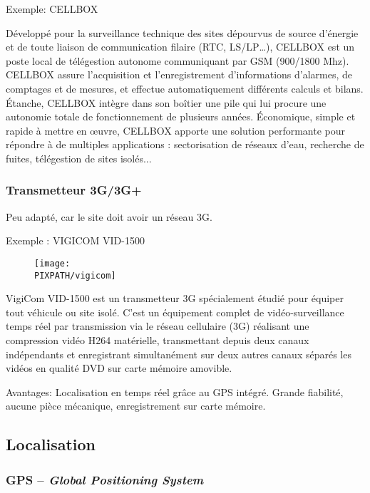 Exemple: CELLBOX

Développé pour la surveillance technique des sites dépourvus de source d’énergie et de toute liaison de communication filaire (RTC, LS/LP…), CELLBOX est un poste local de télégestion autonome communiquant par GSM (900/1800 Mhz).
CELLBOX assure l’acquisition et l’enregistrement d’informations d’alarmes, de comptages et de mesures, et effectue automatiquement différents calculs et bilans.
Étanche, CELLBOX intègre dans son boîtier une pile qui lui procure une autonomie totale de fonctionnement de plusieurs années.
Économique, simple et rapide à mettre en œuvre, CELLBOX apporte une solution performante pour répondre à de multiples applications : sectorisation de réseaux d’eau, recherche de fuites, télégestion de sites isolés...


\subsubsection{Transmetteur 3G/3G+}

Peu adapté, car le site doit avoir un réseau 3G.

Exemple : VIGICOM VID-1500

    \begin{figure}[!h]
    \begin{center}
    \texttt{[image: \\PIXPATH/vigicom]}
    \caption{}
    \end{center}
    \end{figure}

VigiCom VID-1500 est un transmetteur 3G spécialement étudié pour équiper tout véhicule ou site isolé. C’est un équipement complet de vidéo-surveillance temps réel par transmission via le réseau cellulaire (3G) réalisant une compression vidéo H264 matérielle, transmettant depuis deux canaux indépendants et enregistrant simultanément sur deux autres canaux séparés les vidéos en qualité DVD sur carte mémoire amovible.

Avantages:
Localisation en temps réel grâce au GPS intégré. 
Grande fiabilité, aucune pièce mécanique, enregistrement sur carte mémoire.
\subsection{Localisation}

\subsubsection{GPS – \textsl{Global Positioning System}}

